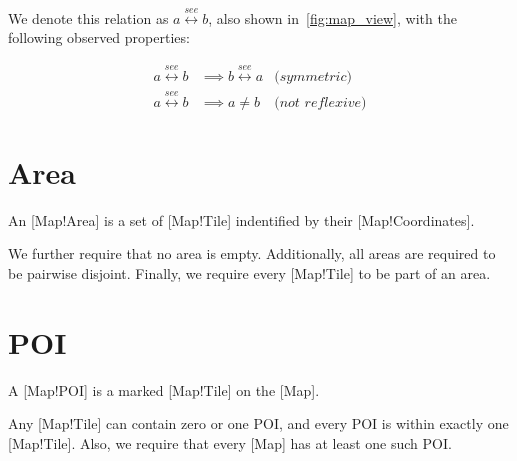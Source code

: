 We denote this relation as \(a \overset{see}{\leftrightarrow} b\), also shown in~\ref{fig:map_view}, with the following observed properties:

\begin{align*}
    a \overset{see}{\leftrightarrow} b &\implies
        b \overset{see}{\leftrightarrow} a&\textit{(symmetric)}\\
    a \overset{see}{\leftrightarrow} b &\implies
        a \neq b&\textit{(not reflexive)}
\end{align*}

\section{Area}

An [Map!Area] is a set of [Map!Tile] indentified by their [Map!Coordinates].

We further require that no area is empty.
Additionally, all areas are required to be pairwise disjoint.
Finally, we require every [Map!Tile] to be part of an area.

\section{POI}

A [Map!POI] is a marked [Map!Tile] on the [Map].

Any [Map!Tile] can contain zero or one POI, and every POI is within exactly one [Map!Tile].
Also, we require that every [Map] has at least one such POI. %
